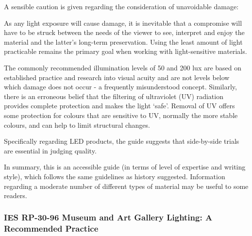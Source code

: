A sensible caution is given regarding the consideration of unavoidable damage: 

\begin{itquote}{}
As any light exposure will cause damage, it is inevitable that a compromise will have to be struck between the needs of the viewer to see, interpret and enjoy the material and the latter's long-term preservation. Using the least amount of light practicable remains the primary goal when working with light-sensitive materials.
\end{itquote}

\begin{itquote}{}
The commonly recommended illumination levels of 50 and 200 lux are based on established practice and research into visual acuity and are not levels below which damage does not occur - a frequently misunderstood concept. Similarly, there is an erroneous belief that the filtering of ultraviolet (UV) radiation provides complete protection and makes the light `safe'. Removal of UV offers some protection for colours that are sensitive to UV, normally the more stable colours, and can help to limit structural changes.
\end{itquote}

Specifically regarding LED products, the guide suggests that side-by-side trials are essential in judging quality.

In summary, this is an accessible guide (in terms of level of expertise and writing style), which follows the same guidelines as history suggested. Information regarding a moderate number of different types of material may be useful to some readers.




\subsubsection{IES RP-30-96 Museum and Art Gallery Lighting: A Recommended Practice}


